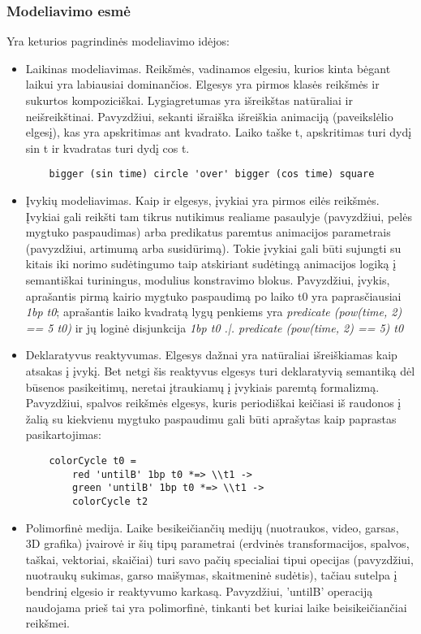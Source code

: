 \subsubsection{Modeliavimo esmė}

Yra keturios pagrindinės modeliavimo idėjos:

\begin{itemize}

	\item Laikinas modeliavimas. Reikšmės, vadinamos elgesiu, kurios kinta bėgant laikui yra labiausiai dominančios. Elgesys yra pirmos klasės reikšmės ir sukurtos kompoziciškai. Lygiagretumas yra išreikštas natūraliai ir neišreikštinai. Pavyzdžiui, sekanti išraiška išreiškia animaciją (paveikslėlio elgesį), kas yra apskritimas ant kvadrato. Laiko taške t, apskritimas turi dydį sin t ir kvadratas turi dydį cos t.

\begin{lstlisting}
	bigger (sin time) circle 'over' bigger (cos time) square
\end{lstlisting}

	\item Įvykių modeliavimas. Kaip ir elgesys, įvykiai yra pirmos eilės reikšmės. Įvykiai gali reikšti tam tikrus nutikimus realiame pasaulyje (pavyzdžiui, pelės mygtuko paspaudimas) arba predikatus paremtus animacijos parametrais (pavyzdžiui, artimumą arba susidūrimą). Tokie įvykiai gali būti sujungti su kitais iki norimo sudėtingumo taip atskiriant sudėtingą animacijos logiką į semantiškai turiningus, modulius konstravimo blokus. Pavyzdžiui, įvykis, aprašantis pirmą kairio mygtuko paspaudimą po laiko t0 yra paprasčiausiai \textit{1bp t0}; aprašantis laiko kvadratą lygų penkiems yra \textit{predicate (pow(time, 2) == 5 t0)} ir jų loginė disjunkcija \textit{1bp t0 .|. predicate (pow(time, 2) == 5) t0}

	\item Deklaratyvus reaktyvumas. Elgesys dažnai yra natūraliai išreiškiamas kaip atsakas į įvykį. Bet netgi šis reaktyvus elgesys turi deklaratyvią semantiką dėl būsenos pasikeitimų, neretai įtraukiamų į įvykiais paremtą formalizmą. Pavyzdžiui, spalvos reikšmės elgesys, kuris periodiškai keičiasi iš raudonos į žalią su kiekvienu mygtuko paspaudimu gali būti aprašytas kaip paprastas pasikartojimas:

\begin{lstlisting}
	colorCycle t0 =
		red 'untilB' 1bp t0 *=> \\t1 ->
		green 'untilB' 1bp t0 *=> \\t1 ->
		colorCycle t2
\end{lstlisting}

	\item Polimorfinė medija. Laike besikeičiančių medijų (nuotraukos, video, garsas, 3D grafika) įvairovė ir šių tipų parametrai (erdvinės transformacijos, spalvos, taškai, vektoriai, skaičiai) turi savo pačių specialiai tipui opecijas (pavyzdžiui, nuotraukų sukimas, garso maišymas, skaitmeninė sudėtis), tačiau sutelpa į bendrinį elgesio ir reaktyvumo karkasą. Pavyzdžiui, 'untilB' operaciją naudojama prieš tai yra polimorfinė, tinkanti bet kuriai laike beisikeičiančiai reikšmei.

\end{itemize}